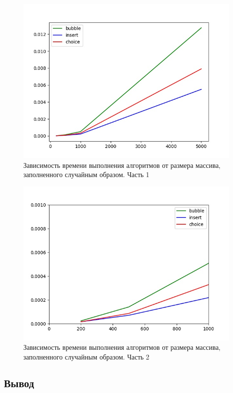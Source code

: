 \documentclass[14pt,russian]{scrartcl}
\begin{document}
    \begin{figure}
    \centering
    \includegraphics[scale=0.7]{random_full.jpeg}
    \caption{Зависимость времени выполнения алгоритмов от  размера массива, заполненного случайным образом. Часть 1}
    \label{img:random_arr_full}
\end{figure}
\begin{figure}
    \centering
    \includegraphics[scale=0.7]{random_part.jpeg}
    \caption{Зависимость времени выполнения алгоритмов от  размера массива, заполненного случайным образом. Часть 2}
    \label{img:random_arr_part}
\end{figure}

    \subsection*{Вывод}
\end{document}
